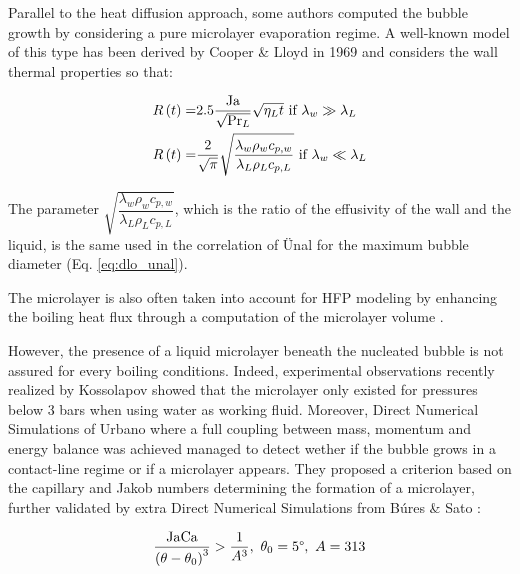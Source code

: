 Parallel to the heat diffusion approach, some authors computed the bubble growth by considering a pure microlayer evaporation regime. A well-known model of this type has been derived by Cooper \& Lloyd in 1969 \cite{cooper_microlayer_1969} and considers the wall thermal properties so that:

\begin{align} 
R\parth{t} =& 2.5 \dfrac{\Ja}{\sqrt{\Pr_{L}}}\sqrt{\eta_{L}t}\ \text{if}\ \lambda_{w} \gg \lambda_{L} \\
%
R\parth{t} =& \dfrac{2}{\sqrt{\pi}} \sqrt{\dfrac{\lambda_{w}\rho_{w}c_{p,w}}{\lambda_{L}\rho_{L}c_{p,L}}}\ \text{if}\ \lambda_{w} \ll \lambda_{L}
\end{align}

\begin{remark*}{}
The parameter $ \sqrt{\dfrac{\lambda_{w}\rho_{w}c_{p,w}}{\lambda_{L}\rho_{L}c_{p,L}}}$, which is the ratio of the effusivity of the wall and the liquid, is the same used in the correlation of \"Unal for the maximum bubble diameter (Eq. \ref{eq:dlo_unal}).
\end{remark*}

The microlayer is also often taken into account for HFP modeling by enhancing the boiling heat flux through a computation of the microlayer volume \cite{kommajosyula_development_2020, demarly_new_2020}. 

\npar

However, the presence of a liquid microlayer beneath the nucleated bubble is not assured for every boiling conditions. Indeed, experimental observations recently realized by Kossolapov \cite{kossolapov_experimental_2021} showed that the microlayer only existed for pressures below 3 bars when using water as working fluid. Moreover, Direct Numerical Simulations of Urbano \etal \cite{urbano_direct_2018} where a full coupling between mass, momentum and energy balance was achieved managed to detect wether if the bubble grows in a contact-line regime or if a microlayer appears. They proposed a criterion based on the capillary and Jakob numbers determining the formation of a microlayer, further validated by extra Direct Numerical Simulations from B\'ures \& Sato \cite{bures_modelling_2021}:

\begin{equation}
\frac{\mathrm{Ja} \mathrm{Ca}}{\left( \theta-\theta_{0} \right)^{3}} > \frac{1}{A^{3}},\ \theta_{0}=5\degree,\ A=313
\end{equation}

